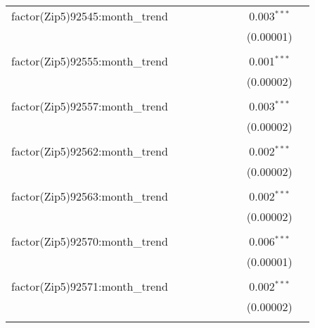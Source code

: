 \begin{table}[H]
{\begin{tabular}{@{\extracolsep{5pt}}lcccccccc}
  factor(Zip5)92545:month\_trend &  &  &  &  &  &  & 0.003$^{***}$ &  \\  

   &  &  &  &  &  &  & (0.00001) &  \\  

   & & & & & & & & \\  

  factor(Zip5)92555:month\_trend &  &  &  &  &  &  & 0.001$^{***}$ &  \\  

   &  &  &  &  &  &  & (0.00002) &  \\  

   & & & & & & & & \\  

  factor(Zip5)92557:month\_trend &  &  &  &  &  &  & 0.003$^{***}$ &  \\  

   &  &  &  &  &  &  & (0.00002) &  \\  

   & & & & & & & & \\  

  factor(Zip5)92562:month\_trend &  &  &  &  &  &  & 0.002$^{***}$ &  \\  

   &  &  &  &  &  &  & (0.00002) &  \\  

   & & & & & & & & \\  

  factor(Zip5)92563:month\_trend &  &  &  &  &  &  & 0.002$^{***}$ &  \\  

   &  &  &  &  &  &  & (0.00002) &  \\  

   & & & & & & & & \\  

  factor(Zip5)92570:month\_trend &  &  &  &  &  &  & 0.006$^{***}$ &  \\  

   &  &  &  &  &  &  & (0.00001) &  \\  

   & & & & & & & & \\  

  factor(Zip5)92571:month\_trend &  &  &  &  &  &  & 0.002$^{***}$ &  \\  

   &  &  &  &  &  &  & (0.00002) &  \\  

   & & & & & & & & \\  


\end{tabular}}
\end{table}
